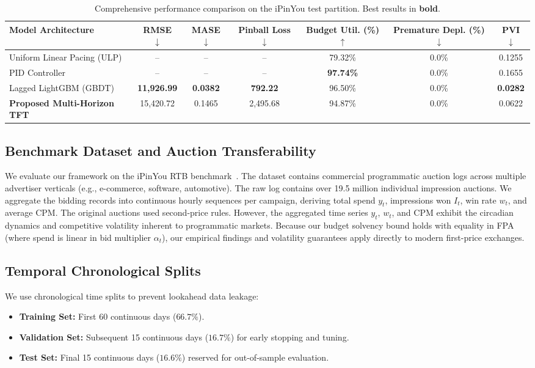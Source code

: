 \documentclass[sigconf]{acmart}
\begin{document}
\begin{table}[t]
\centering
\caption{Comprehensive performance comparison on the iPinYou test partition. Best results in \textbf{bold}.}
\label{tab:main_results}
\small
\begin{tabular}{lcccccc}
\toprule
\textbf{Model Architecture} & \textbf{RMSE} $\downarrow$ & \textbf{MASE} $\downarrow$ & \textbf{Pinball Loss} $\downarrow$ & \textbf{Budget Util. (\%)} $\uparrow$ & \textbf{Premature Depl. (\%)} $\downarrow$ & \textbf{PVI} $\downarrow$ \\
\midrule
Uniform Linear Pacing (ULP) & -- & -- & -- & 79.32\% & 0.0\% & 0.1255 \\
PID Controller & -- & -- & -- & \textbf{97.74\%} & 0.0\% & 0.1655 \\
Lagged LightGBM (GBDT) & \textbf{11,926.99} & \textbf{0.0382} & \textbf{792.22} & 96.50\% & 0.0\% & \textbf{0.0282} \\
\textbf{Proposed Multi-Horizon TFT} & 15,420.72 & 0.1465 & 2,495.68 & 94.87\% & 0.0\% & 0.0622 \\
\bottomrule
\end{tabular}
\end{table}

\subsection{Benchmark Dataset and Auction Transferability}
We evaluate our framework on the iPinYou RTB benchmark~\cite{zhang2015statistical}. The dataset contains commercial programmatic auction logs across multiple advertiser verticals (e.g., e-commerce, software, automotive). The raw log contains over 19.5 million individual impression auctions. We aggregate the bidding records into continuous hourly sequences per campaign, deriving total spend $y_t$, impressions won $I_t$, win rate $w_t$, and average CPM. The original auctions used second-price rules. However, the aggregated time series $y_t$, $w_t$, and CPM exhibit the circadian dynamics and competitive volatility inherent to programmatic markets. Because our budget solvency bound holds with equality in FPA (where spend is linear in bid multiplier $\alpha_t$), our empirical findings and volatility guarantees apply directly to modern first-price exchanges.

\subsection{Temporal Chronological Splits}
We use chronological time splits to prevent lookahead data leakage:
\begin{itemize}
    \item \textbf{Training Set:} First 60 continuous days ($66.7\%$).
    \item \textbf{Validation Set:} Subsequent 15 continuous days ($16.7\%$) for early stopping and tuning.
    \item \textbf{Test Set:} Final 15 continuous days ($16.6\%$) reserved for out-of-sample evaluation.
\end{itemize}
\end{document}
